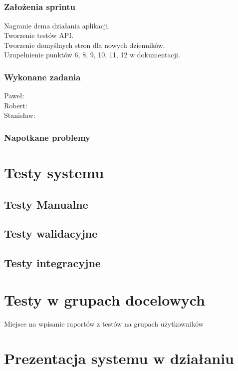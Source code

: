 \documentclass[a4paper,11pt]{report}
\begin{document}
\section {}
\subsection {Założenia sprintu}
Nagranie dema działania aplikacji.\\
Tworzenie testów API.\\
Tworzenie domyślnych stron dla nowych dzienników.\\
Uzupełnienie punktów 6, 8, 9, 10, 11, 12 w dokumentacji.\\
\subsection {Wykonane zadania}
Paweł: \\
Robert: \\
Stanisław: \\
\subsection {Napotkane problemy}


\chapter {Testy systemu}
\section{Testy Manualne}
\section{Testy walidacyjne}
\section{Testy integracyjne}


\chapter {Testy w grupach docelowych}
Miejsce na wpisanie raportów z testów na grupach użytkowników



\chapter{Prezentacja systemu w działaniu}
\end{document}
